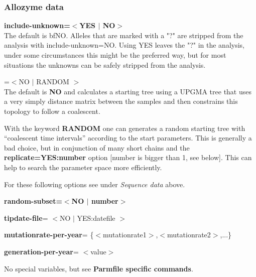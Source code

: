 \subsubsection{Allozyme data}
\begin{description}
\item\textbf{{ include-unknown=$<$YES $|$ NO$>$}}\\ The default is {bf{NO}}. Alleles that are marked with a "?" are stripped from the analysis  with include-unknown=NO. Using YES leaves the "?" in the analysis, under some circumstances this might be the preferred way, but for most situations the unknowns can be safely stripped from the analysis.
\item{=$<$NO $|$  RANDOM $>$}\\
The default is \textbf{NO} and \migrate calculates a starting tree using a UPGMA tree that uses a very simply distance matrix between the samples and then constrains this topology to follow a coalescent. 

 With the keyword \textbf{RANDOM} one can generates a random starting tree with ``coalescent time intervals''  according to the start parameters. This is generally a bad choice,  but in conjunction of many short chains and the \textbf{ replicate=YES:number} 
option [number is bigger than 1, see below]. This can help to search the 
parameter space more efficiently.
\end{description}

For these following options see under \textsl{Sequence data} above.
\begin{description}
\item \textbf{ random-subset=$<$NO $|$ number$>$}
\item\textbf{ tipdate-file}= $<$NO $|$ YES:datefile $>$ 
\item\textbf{ mutationrate-per-year}= \{$<$mutationrate1$>$,$<$mutationrate2$>$,...\} 
\item\textbf{ generation-per-year}= $<$value$>$ 
\end{description}


No special variables, but see \textbf{ Parmfile specific commands}.

